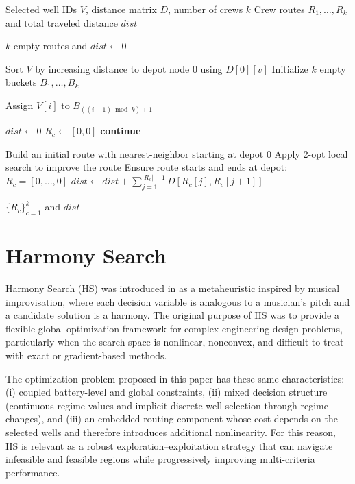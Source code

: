 \documentclass[a4paper,11pt]{article}
\begin{document}
\Needspace{4cm}
\begin{algorithm}[H]
\caption{Multi-crew route construction (nearest-neighbor + 2-opt)}
\label{alg:multi_crew_route}
\begin{algorithmic}[1]
\Require Selected well IDs $V$, distance matrix $D$, number of crews $k$
\Ensure Crew routes $R_1,\dots,R_k$ and total traveled distance $dist$

    \State \Return $k$ empty routes and $dist \gets 0$
\EndIf

\State Sort $V$ by increasing distance to depot node $0$ using $D[0][v]$
\State Initialize $k$ empty buckets $B_1,\dots,B_k$

    \State Assign $V[i]$ to $B_{((i-1) \bmod k)+1}$ 
\EndFor

\State $dist \gets 0$
        \State $R_c \gets [0,0]$
        \State \textbf{continue}
    \EndIf

    \State Build an initial route with nearest-neighbor starting at depot $0$
    \State Apply 2-opt local search to improve the route
    \State Ensure route starts and ends at depot: $R_c = [0,\dots,0]$
    \State $dist \gets dist + \sum_{j=1}^{|R_c|-1} D[R_c[j], R_c[j+1]]$
\EndFor

\State \Return $\{R_c\}_{c=1}^{k}$ and $dist$

\end{algorithmic}
\end{algorithm}



\section{Harmony Search}

Harmony Search (HS) was introduced in \cite{geem_harmony_search} as a metaheuristic inspired by musical improvisation, where each decision variable is analogous to a musician's pitch and a candidate solution is a harmony. The original purpose of HS was to provide a flexible global optimization framework for complex engineering design problems, particularly when the search space is nonlinear, nonconvex, and difficult to treat with exact or gradient-based methods.  

The optimization problem proposed in this paper has these same characteristics: (i) coupled battery-level and global constraints, (ii) mixed decision structure (continuous regime values and implicit discrete well selection through regime changes), and (iii) an embedded routing component whose cost depends on the selected wells and therefore introduces additional nonlinearity. For this reason, HS is relevant as a robust exploration--exploitation strategy that can navigate infeasible and feasible regions while progressively improving multi-criteria performance.  
\end{document}
